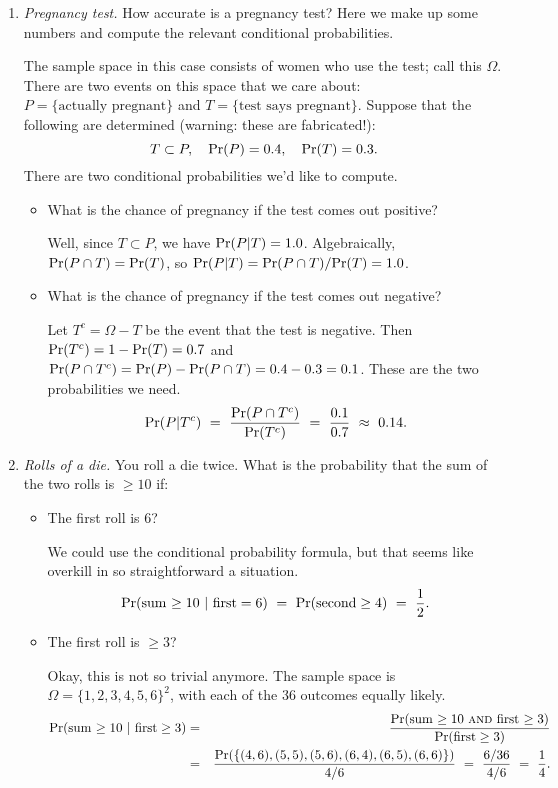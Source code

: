 \begin{enumerate}

\item {\it Pregnancy test.} How accurate is a pregnancy test? Here we make up some numbers and compute the relevant conditional probabilities.

The sample space in this case consists of women who use the test; call this $\Omega$. There are two events on this space that we care about: $P = \{\mbox{actually pregnant}\}$ and $T = \{\mbox{test says pregnant}\}$. Suppose that the following are determined (warning: these are fabricated!):
$$ T \subset P, \ \ \ \mbox{\rm Pr}(P) = 0.4, \ \ \ \mbox{\rm Pr}(T) = 0.3 .$$
There are two conditional probabilities we'd like to compute.
\begin{itemize}
\item What is the chance of pregnancy if the test comes out positive?

Well, since $T \subset P$, we have $\mbox{\rm Pr}(P|T) = 1.0$. Algebraically, $\mbox{\rm Pr}(P \cap T) = \mbox{\rm Pr}(T)$, so $\mbox{\rm Pr}(P|T) = \mbox{\rm Pr}(P \cap T)/\mbox{\rm Pr}(T) = 1.0$.

\item What is the chance of pregnancy if the test comes out negative?

Let $T^c = \Omega - T$ be the event that the test is negative. Then $\mbox{\rm Pr}(T^c) = 1 - \mbox{\rm Pr}(T) = 0.7$ and $\mbox{\rm Pr}(P \cap T^c) = \mbox{\rm Pr}(P) - \mbox{\rm Pr}(P \cap T) = 0.4 - 0.3 = 0.1$. These are the two probabilities we need.
$$ \mbox{\rm Pr}(P | T^c)  \ = \ \frac{\mbox{\rm Pr}(P \cap T^c)}{\mbox{\rm Pr}(T^c)} \ = \ \frac{0.1}{0.7} \ \approx \ 0.14 .$$
\end{itemize}

\item {\it Rolls of a die.} You roll a die twice. What is the probability that the sum of the two rolls is $\geq 10$ if:
\begin{itemize}
\item The first roll is 6?

We could use the conditional probability formula, but that seems like overkill in so straightforward a situation.
$$ \mbox{\rm Pr}(\mbox{sum $\geq 10$} \ | \ \mbox{first} = 6) 
\ = \ \mbox{\rm Pr}(\mbox{second} \geq 4) \ = \ \frac{1}{2} .
$$

\item The first roll is $\geq 3$?

Okay, this is not so trivial anymore. The sample space is $\Omega = \{1,2,3,4,5,6\}^2$, with each of the 36 outcomes equally likely.
\begin{eqnarray*}
\pr(\mbox{sum $\geq 10$} \ | \ \mbox{first} \geq 3) 
& = & 
\frac{\pr(\mbox{sum $\geq 10$ {\sc and} first $\geq 3$})}{\pr(\mbox{first} \geq 3)} \\
& = &
\frac{\pr(\{(4,6), (5,5), (5,6), (6,4), (6,5), (6,6)\})}{4/6}
\ = \ 
\frac{6/36}{4/6} \ = \ \frac{1}{4} .
\end{eqnarray*}


\end{itemize}
\end{enumerate}
